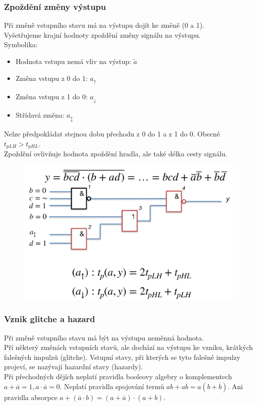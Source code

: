 \subsubsection{Zpoždění změny výstupu}
Při změně vstupního stavu má na výstupu dojít ke změně (0 a 1).\\
Vyšetřujeme krajní hodnoty zpoždění změny signálu na výstupu.\\
Symbolika:
\begin{itemize}
    \item Hodnota vstupu nemá vliv na výstup: \(\widetilde{a}\)
    \item Změna vstupu z 0 do 1: \(a_{\uparrow}\)
    \item Změna vstupu z 1 do 0: \(a_{\downarrow}\)
    \item Střídavá změna: \(a_{\updownarrow}\)
\end{itemize}
Nelze předpokládat stejnou dobu přechodu z 0 do 1 a z 1 do 0. Obecně \(t_{pLH} > t_{pHL}\).\\
Zpoždění ovlivňuje hodnota zpoždění hradla, ale také délka cesty signálu. \\
\begin{figure}[h!]
    \centering
    \includegraphics[scale = 0.3]{img/PrechDej.png}
\end{figure}

\subsubsection{Vznik glitche a hazard}
Při změně vstupního stavu má být na výstupu neměnná hodnota.\\
Pří některý změnách vstupních stavů, ale dochází na výstupu ke vzniku, krátkých falešných impulzů (glitche). Vstupní stavy, při kterých se tyto falešné impulzy projeví, se nazývají hazardní stavy (hazardy).\\
Při přechodných dějích neplatí pravidla booleovy algebry o komplementech \(a + \overline{a} = 1, a\cdot \overline{a} = 0\). Neplatí pravidla spojování termů \(ab + a\overline{b} = a(b + \overline{b})\). Ani pravidla absorpce \(a + (\overline{a} \cdot b)= (a + \overline{a})\cdot (a + b)\).\\


